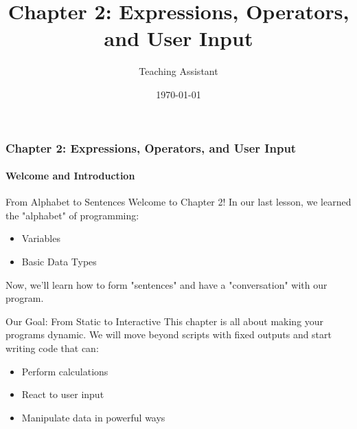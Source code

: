 \documentclass{beamer}
\title{Chapter 2: Expressions, Operators, and User Input}
\author{Teaching Assistant}
\institute{University Department}
\date{\today}
\begin{document}
\frame{\titlepage}

\begin{frame}[fragile]
    \frametitle{Chapter 2: Expressions, Operators, and User Input}
    \framesubtitle{Welcome and Introduction}
    
    \begin{block}{From Alphabet to Sentences}
        Welcome to Chapter 2! In our last lesson, we learned the "alphabet" of programming:
        \begin{itemize}
            \item Variables
            \item Basic Data Types
        \end{itemize}
        Now, we'll learn how to form "sentences" and have a "conversation" with our program.
    \end{block}
    
    \vspace{1em}
    
    \begin{alertblock}{Our Goal: From Static to Interactive}
        This chapter is all about making your programs dynamic. We will move beyond scripts with fixed outputs and start writing code that can:
        \begin{itemize}
            \item Perform calculations
            \item React to user input
            \item Manipulate data in powerful ways
        \end{itemize}
    \end{alertblock}
    
\end{frame}
\end{document}
